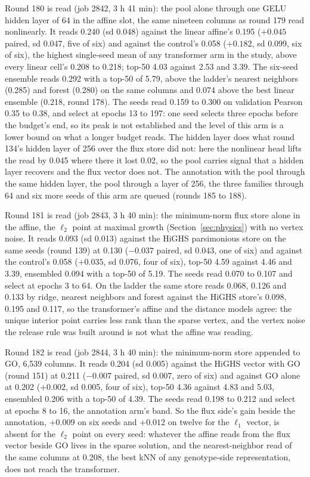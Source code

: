 Round 180 is read (job 2842, 3 h 41 min): the pool alone through one GELU hidden layer
of 64 in the affine slot, the same nineteen columns as round 179 read nonlinearly. It
reads 0.240 (sd 0.048) against the linear affine's 0.195 ($+0.045$ paired, sd 0.047,
five of six) and against the control's 0.058 ($+0.182$, sd 0.099, six of six), the
highest single-seed mean of any transformer arm in the study, above every linear cell's
0.208 to 0.218; top-50 4.03 against 2.53 and 3.39. The six-seed ensemble reads 0.292
with a top-50 of 5.79, above the ladder's nearest neighbors (0.285) and forest (0.280)
on the same columns and 0.074 above the best linear ensemble (0.218, round 178). The
seeds read 0.159 to 0.300 on validation Pearson 0.35 to 0.38, and select at epochs 13
to 197: one seed selects three epochs before the budget's end, so its peak is not
established and the level of this arm is a lower bound on what a longer budget reads.
The hidden layer does what round 134's hidden layer of 256 over the flux store did not:
here the nonlinear head lifts the read by 0.045 where there it lost 0.02, so the pool
carries signal that a hidden layer recovers and the flux vector does not. The
annotation with the pool through the same hidden layer, the pool through a layer of
256, the three families through 64 and six more seeds of this arm are queued (rounds
185 to 188).

Round 181 is read (job 2843, 3 h 40 min): the minimum-norm flux store alone in the
affine, the $\ell_2$ point at maximal growth (Section~\ref{sec:physics}) with no vertex
noise. It reads 0.093 (sd 0.013) against the HiGHS parsimonious store on the same seeds
(round 139) at 0.130 ($-0.037$ paired, sd 0.043, one of six) and against the control's
0.058 ($+0.035$, sd 0.076, four of six), top-50 4.59 against 4.46 and 3.39, ensembled
0.094 with a top-50 of 5.19. The seeds read 0.070 to 0.107 and select at epochs 3 to
64. On the ladder the same store reads 0.068, 0.126 and 0.133 by ridge, nearest
neighbors and forest against the HiGHS store's 0.098, 0.195 and 0.117, so the
transformer's affine and the distance models agree: the unique interior point carries
less rank than the sparse vertex, and the vertex noise the release rule was built
around is not what the affine was reading.

Round 182 is read (job 2844, 3 h 40 min): the minimum-norm store appended to GO, 6,539
columns. It reads 0.204 (sd 0.005) against the HiGHS vector with GO (round 151) at
0.211 ($-0.007$ paired, sd 0.007, zero of six) and against GO alone at 0.202 ($+0.002$,
sd 0.005, four of six), top-50 4.36 against 4.83 and 5.03, ensembled 0.206 with a
top-50 of 4.39. The seeds read 0.198 to 0.212 and select at epochs 8 to 16, the
annotation arm's band. So the flux side's gain beside the annotation, $+0.009$ on six
seeds and $+0.012$ on twelve for the $\ell_1$ vector, is absent for the $\ell_2$ point
on every seed: whatever the affine reads from the flux vector beside GO lives in the
sparse solution, and the nearest-neighbor read of the same columns at 0.208, the best
kNN of any genotype-side representation, does not reach the transformer.

